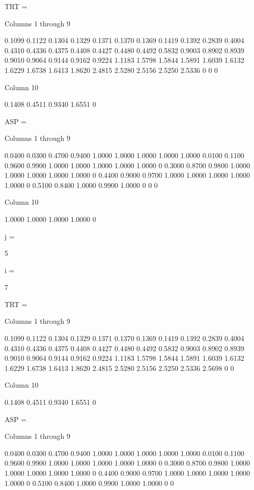 TRT =

  Columns 1 through 9

    0.1099    0.1122    0.1304    0.1329    0.1371    0.1370    0.1369    0.1419    0.1392
    0.2839    0.4004    0.4310    0.4336    0.4375    0.4408    0.4427    0.4480    0.4492
    0.5832    0.9003    0.8902    0.8939    0.9010    0.9064    0.9144    0.9162    0.9224
    1.1183    1.5798    1.5844    1.5891    1.6039    1.6132    1.6229    1.6738    1.6413
    1.8620    2.4815    2.5280    2.5156    2.5250    2.5336         0         0         0

  Column 10

    0.1408
    0.4511
    0.9340
    1.6551
         0


ASP =

  Columns 1 through 9

    0.0400    0.0300    0.4700    0.9400    1.0000    1.0000    1.0000    1.0000    1.0000
    0.0100    0.1100    0.9600    0.9900    1.0000    1.0000    1.0000    1.0000    1.0000
         0    0.3000    0.8700    0.9800    1.0000    1.0000    1.0000    1.0000    1.0000
         0    0.4400    0.9000    0.9700    1.0000    1.0000    1.0000    1.0000    1.0000
         0    0.5100    0.8400    1.0000    0.9900    1.0000         0         0         0

  Column 10

    1.0000
    1.0000
    1.0000
    1.0000
         0


j =

     5


i =

     7


TRT =

  Columns 1 through 9

    0.1099    0.1122    0.1304    0.1329    0.1371    0.1370    0.1369    0.1419    0.1392
    0.2839    0.4004    0.4310    0.4336    0.4375    0.4408    0.4427    0.4480    0.4492
    0.5832    0.9003    0.8902    0.8939    0.9010    0.9064    0.9144    0.9162    0.9224
    1.1183    1.5798    1.5844    1.5891    1.6039    1.6132    1.6229    1.6738    1.6413
    1.8620    2.4815    2.5280    2.5156    2.5250    2.5336    2.5698         0         0

  Column 10

    0.1408
    0.4511
    0.9340
    1.6551
         0


ASP =

  Columns 1 through 9

    0.0400    0.0300    0.4700    0.9400    1.0000    1.0000    1.0000    1.0000    1.0000
    0.0100    0.1100    0.9600    0.9900    1.0000    1.0000    1.0000    1.0000    1.0000
         0    0.3000    0.8700    0.9800    1.0000    1.0000    1.0000    1.0000    1.0000
         0    0.4400    0.9000    0.9700    1.0000    1.0000    1.0000    1.0000    1.0000
         0    0.5100    0.8400    1.0000    0.9900    1.0000    1.0000         0         0

